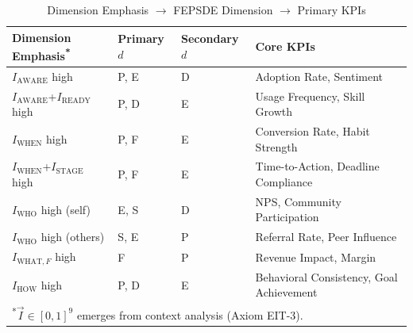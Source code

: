 \begin{table}[htbp]
\centering
\caption{Dimension Emphasis $\rightarrow$ FEPSDE Dimension $\rightarrow$ Primary KPIs}
\label{tab:hhh-type-kpi-mapping}
\renewcommand{\arraystretch}{1.3}
\footnotesize
\begin{tabular}{@{}llll@{}}
\toprule
\textbf{Dimension Emphasis}\textsuperscript{*} & \textbf{Primary $d$} & \textbf{Secondary $d$} & \textbf{Core KPIs} \\
\midrule
$I_{\text{AWARE}}$ high & P, E & D & Adoption Rate, Sentiment \\
$I_{\text{AWARE}}$+$I_{\text{READY}}$ high & P, D & E & Usage Frequency, Skill Growth \\
$I_{\text{WHEN}}$ high & P, F & E & Conversion Rate, Habit Strength \\
$I_{\text{WHEN}}$+$I_{\text{STAGE}}$ high & P, F & E & Time-to-Action, Deadline Compliance \\
$I_{\text{WHO}}$ high (self) & E, S & D & NPS, Community Participation \\
$I_{\text{WHO}}$ high (others) & S, E & P & Referral Rate, Peer Influence \\
$I_{\text{WHAT},F}$ high & F & P & Revenue Impact, Margin \\
$I_{\text{HOW}}$ high & P, D & E & Behavioral Consistency, Goal Achievement \\
\bottomrule
\multicolumn{4}{l}{\textsuperscript{*}\footnotesize $\vec{I} \in [0,1]^9$ emerges from context analysis (Axiom EIT-3).}
\end{tabular}
\end{table}

